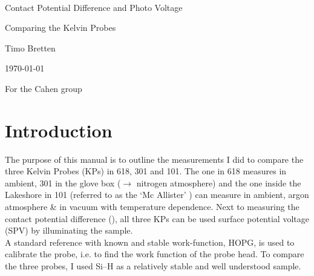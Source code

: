 \documentclass[a4paper,10pt]{article}
\newcommand{\mktit}{
	\thispagestyle{empty}
	\begin{center}
	\hrulefill \\
	\begin{huge}Contact Potential Difference and Photo Voltage \\ \end{huge} 
	\begin{Large} Comparing the Kelvin Probes \\ \end{Large} \vspace*{0.8cm}

	\begin{large}Timo Bretten  \\\end{large} \vspace*{1.2cm}	
	
	\today \\ \vspace*{0.8cm}
	\begin{LARGE}For the Cahen group\\\end{LARGE}
	
	\end{center}
	\newpage
	\setcounter{page}{2}
}
\newcommand{\sih}{Si--H}
\newcommand{\cpd}{\text{CPD}}
\newcommand{\McA}{Mc Allister}
\newcommand{\hopg}{HOPG}
\newcommand{\kp}{KP}
\newcommand{\spv}{SPV}
\newcommand{\ie}{i.e.}
\begin{document}
\mktit

\section{Introduction}
The purpose of this manual is to outline the measurements I did to compare the three Kelvin Probes (\kp{}s) in 618, 301 and 101. The one in 618 measures in ambient, 301 in the glove box ($\rightarrow$ nitrogen atmosphere) and the one inside the Lakeshore in 101 (referred to as the \lq{}\McA{}\rq{} ) can measure in ambient, argon atmosphere \& in vacuum with temperature dependence. Next to measuring the contact potential difference (\cpd{}), all three \kp{}s can be used surface potential voltage (\spv{}) by illuminating the sample.\\
A standard reference with known and stable work-function, \hopg{}, is used to calibrate the probe, \ie{} to find the work function of the probe head. To compare the three probes, I used \sih{} as a relatively stable and well understood sample.
\end{document}
